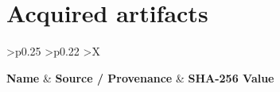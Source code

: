 \documentclass[11pt,a4paper,final,oneside]{article}
\begin{document}
\clearpage

\section{Acquired artifacts}
\label{sec:acquired_artifacts}


\renewcommand{\arraystretch}{1.4}

\begin{xltabular}{\textwidth}{
>{\centering\arraybackslash}p{0.25\textwidth}
>{\centering\arraybackslash}p{0.22\textwidth}
>{\centering\arraybackslash}X}
\hline

\textbf{Name} &
\textbf{Source / Provenance} &
\textbf{SHA-256 Value}
\\
\hline
\endhead


\end{xltabular}
\end{document}
